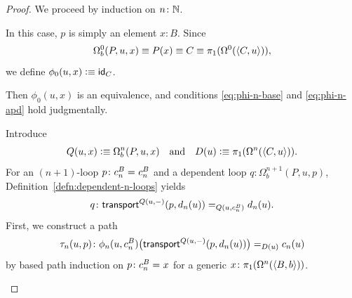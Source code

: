 \begin{proof}
    We proceed by induction on $n\colon\N$.

    \begin{description}[font=\normalfont\scshape]
        \item[Base Case ($n=0$):] In this case, $p$ is simply an element $x\colon B$. Since
        \[
            \Omega^0_b(P,u,x)
                \equiv P(x)
                \equiv C
                \equiv\pi_1(\Omega^0(\langle C,u\rangle)),
        \]
        we define $\phi_0(u,x)\mathrel{\vcentcolon}\equiv\mathsf{id}_C$.

        Then $\phi_0(u,x)$ is an equivalence, and conditions \eqref{eq:phi-n-base} and \eqref{eq:phi-n-apd} hold judgmentally.

        \item[Inductive Step ($n\mapsto n+1$):] Introduce
        \[
            Q(u,x)\mathrel{\vcentcolon}\equiv\Omega^n_b(P,u,x)
            \quad\text{and}\quad
            D(u)\mathrel{\vcentcolon}\equiv\pi_1(\Omega^n(\langle C,u\rangle)).
        \]
        For an $(n+1)$-loop $p\colon c_n^B\eq{}c_n^B$ and a dependent loop $q\colon\Omega^{n+1}_b(P,u,p)$, Definition~\ref{defn:dependent-n-loops} yields
        \[
            q\colon
                \fun{transport}^{Q(u,\dummy)}(p,d_n(u))
                \eq{Q(u,c_n^B)}
                d_n(u).
        \]
        First, we construct a path
        \[
        \tau_n(u,p)\colon
            \phi_n(u,c_n^B)
                \bigl(
                    \fun{transport}^{Q(u,\dummy)}
                        (p,d_n(u))
                \bigr)
                \eq{D(u)}c_n(u)
        \]
        by based path induction on $p\colon c_n^B\eq{}x$ for a generic $x\colon\pi_1(\Omega^n(\dep{B,b}))$.


\end{description}
\end{proof}
